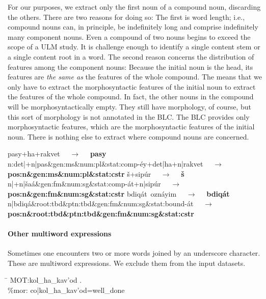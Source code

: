 For our purposes, we extract only the first noun of a compound noun, 
discarding the others. 
There are two reasons for doing so:
The first is word length; 
i.e., compound nouns can, in principle, be indefinitely long and comprise
indefinitely many component nouns.
Even a compound of two nouns begins to exceed the scope 
of a ULM study. It is challenge enough 
to identify a single 
content stem or a single content root in a word. 
The second reason concerns the distribution of features among the 
component nouns: Because the initial noun is the head, its 
features are \emph{the same as} the features of the whole compound. 
The means that we only have to extract the morphosyntactic 
features of the initial noun to extract the features of the whole 
compound. In fact, the other nouns in the compound will be 
morphosyntactically empty. They still have morphology, of course, 
but this sort of morphology is not annotated in 
the \ac{BLC}. The \ac{BLC} provides only morphosyntactic 
features, which are the morphosyntactic features of the initial 
noun. There is nothing else to extract where compound nouns 
are concerned.

\begin{exe}
\ex \label{ex:cstr:pasey2}
	\textsf{pasy+ha+rakvet} $\quad\to\quad$ 
	\textbf{\textsf{pasy}} \\
	\textsf{n:det|+n|pas\&gen:ms\&num:pl\&stat:comp-\'{e}y+det|ha+n|rakvet} $\quad\to\quad$ \\
	\textbf{\textsf{pos:n\&gen:ms\&num:pl\&stat:cstr}}
\ex \label{ex:cstr:shaat2} 
	\textsf{\v{s}+sip\'{u}r} $\quad\to\quad$ \textbf{\textsf{\v{s}}}\\
	\textsf{n|+n|\v{s}a\'a\&gen:fm\&num:sg\&stat:comp-\'at+n|sip\'ur} $\quad\to\quad$ \\
	\textbf{\textsf{pos:n\&gen:fm\&num:sg\&stat:cstr}}
\ex \label{ex:cstr:bdiqat2} 
	\textsf{bdiq\'{a}t\, ozn\'{a}yim} $\quad\to\quad$ \textbf{\textsf{\textsf{bdiq\'{a}t}}} \\ 
	\textsf{n|bdiq\'{a}\&root:tbd\&ptn:tbd\&gen:fm\&num:sg\&stat:bound-\'{a}t} $\quad\to\quad$ \\
	\textbf{\textsf{pos:n\&root:tbd\&ptn:tbd\&gen:fm\&num:sg\&stat:cstr}}
\end{exe}

\paragraph{Other multiword expressions} Sometimes one encounters two or more words joined 
by an underscore character. These are multiword expressions. We exclude them from
the input datasets. 
\begin{exe}
\ex \begin{tabbing}
\hspace{0.6in} \= \hspace{5.5in} \kill
\textsf{\*MOT:}\>\textsf{kol\_ha\_kav\a'{o}d .} \\
\textsf{\%mor:} \> \textsf{co|kol\_ha\_kav\a'{o}d=well\_done}
\end{tabbing}
\end{exe}


